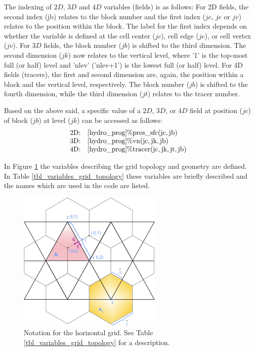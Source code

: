 \documentclass[a4paper,11pt,DIV16,BCOR1cm,titlepage]{scrartcl}
\begin{document}
The indexing of $2D$, $3D$ and $4D$ variables (fields) is as follows: For 2D fields, the second index 
(jb) relates to the block number and the first index ($jc$, $je$ or $jv$) relates to the position 
within the block. The label for the first index depends on whether the variable is defined at the 
cell center ($jc$), cell edge ($je$), or cell vertex ($jv$). For $3D$ fields, the block number ($jb$) 
is shifted to the third dimension. The second dimension ($jk$) now relates to the vertical level, 
where '1' is the top-most full (or half) level and 'nlev' ('nlev+1') is the lowest full 
(or half) level. For 4D fields (tracers), the first and second dimension are, again, the position 
within a block and the vertical level, respectively. The block number ($jb$) is shifted to the 
fourth dimension, while the third dimension ($jt$) relates to the tracer number.

Based on the above said, a specific value of a $2D$, $3D$, or $4D$ field at position 
($jc$) of block ($jb$) at level ($jk$) can be accessed as follows:
\begin{displaymath}
\begin{array}{l l}
\text{2D:} &\mathrm{[hydro\_prog]\%pres\_sfc(jc,jb)} \\ 
\text{3D:} &\mathrm{[hydro\_prog]\%vn(jc,jk,jb)} \\ 
\text{4D:} &\mathrm{[hydro\_prog]\%tracer(jc,jk,jt,jb)}
\end{array}
\end{displaymath}


In Figure \ref{fig:grid_topology} the variables describing the grid topology 
and geometry are defined. In Table \ref{tbl_variables_grid_topology} these variables 
are briefly described and the names which are used in the code are listed.
\begin{figure}[htbp]
  \centering
  \includegraphics[width=7.0cm,draft=false]{../contrib/ICON_Grafik3_Okt09.jpg} %
    \caption{Notation for the horizontal grid. 
    See Table \ref{tbl_variables_grid_topology} for a description.}
    \label{fig:grid_topology}
\end{figure}
\end{document}
